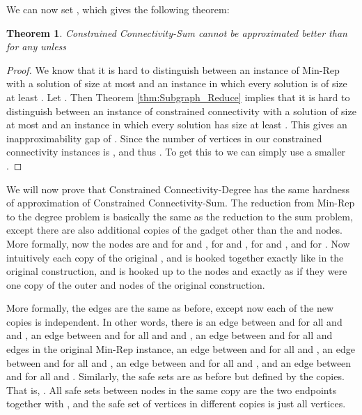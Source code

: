 \documentclass[11pt,letterpaper]{article}
\newtheorem{theorem}{Theorem}[section]
\theoremstyle{definition}
\begin{document}
We can now set , which gives the following theorem:

\begin{theorem} \label{thm:ccsumhard}
  {\sc Constrained Connectivity-Sum} cannot be approximated better
  than  for any  unless 
\end{theorem}
\begin{proof}
  We know that it is hard to distinguish between an instance of
  {\sc Min-Rep} with a solution of size at most  and an instance in
  which every solution is of size at least .  Let .  Then Theorem
  \ref{thm:Subgraph_Reduce} implies that it is hard to distinguish
  between an instance of constrained connectivity with a solution of
  size at most  and an instance in which every solution has size at least
  .  This
  gives an inapproximability gap of .  Since  the number of vertices  in our
  constrained connectivity instances is , and thus .  To get this to  we can simply use a smaller .
\end{proof}

We will now prove that {\sc Constrained Connectivity-Degree} has the same hardness of approximation of {\sc Constrained Connectivity-Sum}.  The reduction from {\sc Min-Rep} to the degree problem is basically the same as the reduction to the sum problem, except there are also  additional copies of the gadget other than the  and  nodes.  More formally, now the nodes are  and  for  and ,  for  and ,  for  and , and  for .  Now intuitively each copy  of the original , and  is hooked together exactly like in the original construction, and is hooked up to the nodes  and  exactly as if they were one copy of the outer  and  nodes of the original construction.

More formally, the edges are the same as before, except now each of the  new copies is independent.  In other words, there is an edge between  and  for all  and  and , an edge between  and  for all  and  and , an edge between  and  for all  and edges  in the original {\sc Min-Rep} instance, an edge between  and  for all  and , an edge between  and  for all  and , an edge between  and  for all  and , and an edge between  and  for all  and .  Similarly, the safe sets are as before but defined by the copies.  That is, .  All safe sets between nodes in the same copy  are the two endpoints together with , and the safe set of vertices in different copies is just all vertices.
\end{document}

